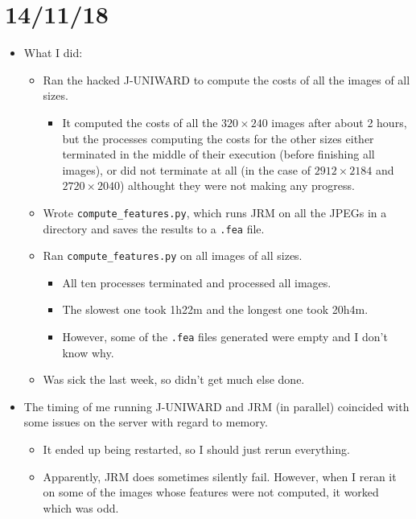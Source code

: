 \documentclass[11pt,a4paper]{report}
\begin{document}
\section{14/11/18}

\begin{itemize}

\item What I did:
  \begin{itemize}
  \item Ran the hacked J-UNIWARD to compute the costs of all the images of all sizes.
    \begin{itemize}
    \item It computed the costs of all the $320 \times 240$ images after about 2 hours, but the processes computing the costs for the other sizes either terminated in the middle of their execution (before finishing all images), or did not terminate at all (in the case of $2912 \times 2184$ and $2720 \times 2040$) althought they were not making any progress.
    \end{itemize}

  \item Wrote \texttt{compute\_features.py}, which runs JRM on all the JPEGs in a directory and saves the results to a \texttt{.fea} file.
  
  \item Ran \texttt{compute\_features.py} on all images of all sizes.
    \begin{itemize}
    \item All ten processes terminated and processed all images.
    \item The slowest one took 1h22m and the longest one took 20h4m.
    \item However, some of the \texttt{.fea} files generated were empty and I don't know why.
    \end{itemize}

  \item Was sick the last week, so didn't get much else done.
  \end{itemize}

\item The timing of me running J-UNIWARD and JRM (in parallel) coincided with some issues on the server with regard to memory.
  \begin{itemize}
  \item It ended up being restarted, so I should just rerun everything.
  \item Apparently, JRM does sometimes silently fail. However, when I reran it on some of the images whose features were not computed, it worked which was odd.
  \end{itemize}


\end{itemize}
\end{document}

